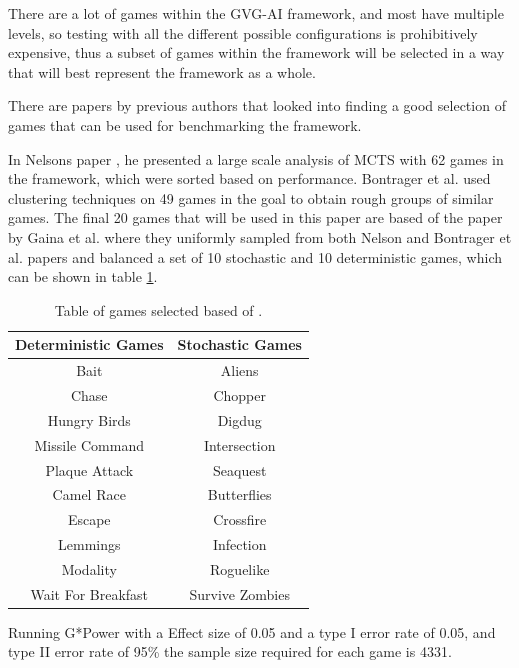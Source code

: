 \documentclass[journal]{IEEEtran}
\begin{document}
	There are a lot of games within the GVG-AI framework, and most have multiple levels, so testing with all the different possible configurations is prohibitively expensive, thus a subset of games within the framework will be selected in a way that will best represent the framework as a whole.
	
	There are papers by previous authors that looked into finding a good selection of games that can be used for benchmarking the framework. \cite{gaina2017population}
	
	In Nelsons paper \cite{nelson2016investigating}, he presented a large scale analysis of MCTS with 62 games in the framework, which were sorted based on performance. Bontrager et al. \cite{bontrager2016matching} used clustering techniques on 49 games in the goal to obtain rough groups of similar games.
	The final 20 games that will be used in this paper are based of the paper by Gaina et al. \cite{gaina2017population} where they uniformly sampled from both Nelson and Bontrager et al. papers and balanced a set of 10 stochastic and 10 deterministic games, which can be shown in table \ref{GamesTable}.
	
	
	\begin{table}[h!]
	\centering
	\begin{tabular} { |c||c|} 
		 \hline
		 \bf{Deterministic Games} & \bf{Stochastic Games} \\
		 \hline
		 Bait & Aliens  \\
 		Chase  & Chopper   \\
		Hungry Birds  & Digdug   \\
		Missile Command  & Intersection   \\
		Plaque Attack  & Seaquest   \\
		Camel Race  & Butterflies   \\
		Escape  & Crossfire   \\
		Lemmings  & Infection   \\
		Modality  & Roguelike   \\
		Wait For Breakfast  & Survive Zombies   \\
		\hline
	\end{tabular}
	\caption{ Table of games selected based of \cite{guerrero2017beyond, gaina2017population}.}
	\label{GamesTable}
	\end{table}


		Running G*Power with a Effect size of 0.05 and a type I error rate of 0.05, and type II error rate of 95\% the sample size required for each game is 4331.
\end{document}

